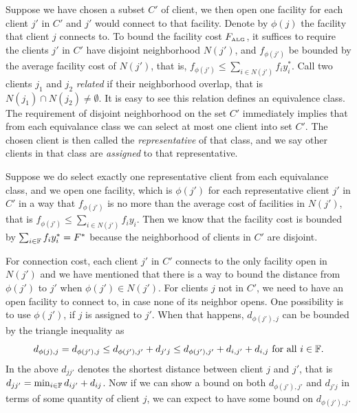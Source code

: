 \documentclass[oneside,final]{ucr}
\begin{document}
Suppose we have chosen a subset $C'$ of client, we then open
one facility for each client $j'$ in $C'$ and $j'$ would
connect to that facility. Denote by $\phi(j)$ the facility
that client $j$ connects to. To bound the facility cost
$F_{\mbox{\tiny\rm ALG}}$, it suffices to require the clients $j'$ in
$C'$ have disjoint neighborhood $N(j')$, and $f_{\phi(j')}$
be bounded by the average facility cost of $N(j')$, that is,
$f_{\phi(j')} \leq \sum_{i\in N(j')} f_i y_i^\ast$. Call two
clients $j_1$ and $j_2$ \emph{related} if their neighborhood
overlap, that is $N(j_1) \cap N(j_2) \neq \emptyset$. It is
easy to see this relation defines an equivalence class. The
requirement of disjoint neighborhood on the set $C'$
immediately implies that from each equivalance class we can
select at most one client into set $C'$. The chosen client
is then called the \emph{representative} of that class, and
we say other clients in that class are \emph{assigned} to
that representative.

Suppose we do select exactly one representative client from
each equivalance class, and we open one facility, which is
$\phi(j')$ for each representative client $j'$ in $C'$ in a
way that $f_{\phi(j')}$ is no more than the average cost of
facilities in $N(j')$, that is $f_{\phi(j')} \leq \sum_{i\in
  N(j')} f_i y_{i}$. Then we know that the facility cost is
bounded by $\sum_{i\in \mathbb{F}} f_i y_i^\ast = F^\ast$
because the neighborhood of clients in $C'$ are disjoint.

For connection cost, each client $j'$ in $C'$ connects to
the only facility open in $N(j')$ and we have mentioned that
there is a way to bound the distance from $\phi(j')$ to $j'$
when $\phi(j') \in N(j')$. For clients $j$ not in $C'$, we
need to have an open facility to connect to, in case none of
its neighbor opens. One possibility is to use $\phi(j')$, if
$j$ is assigned to $j'$. When that happens, $d_{\phi(j'), j}$
can be bounded by the triangle inequality as
\begin{equation*}
  d_{\phi(j),j} = d_{\phi(j'), j} \leq d_{\phi(j'), j'} + d_{j'j} \leq
  d_{\phi(j'), j'} + d_{i,j'} + d_{i,j} \text{ for all } i
  \in \mathbb{F}.
\end{equation*}
In the above $d_{jj'}$ denotes the shortest distance between
client $j$ and $j'$, that is $d_{jj'} = \min_{i\in\mathbb{F}}
d_{ij'} + d_{ij}$. Now if we can show a bound on both
$d_{\phi(j'),j'}$ and $d_{j'j}$ in terms of some quantity of
client $j$, we can expect to have some bound on
$d_{\phi(j'),j}$.
\end{document}
